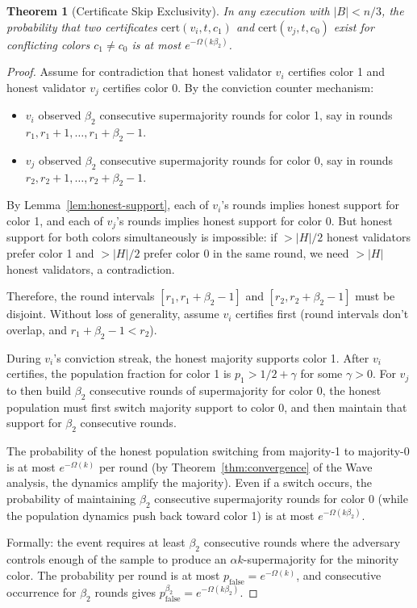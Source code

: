 \documentclass[11pt,a4paper]{article}
\newtheorem{theorem}{Theorem}[section]
\begin{document}
\begin{theorem}[Certificate Skip Exclusivity]
\label{thm:cse}
In any execution with $|B| < n/3$, the probability that two certificates
$\text{cert}(v_i, t, c_1)$ and $\text{cert}(v_j, t, c_0)$ exist for conflicting
colors $c_1 \neq c_0$ is at most $e^{-\Omega(k\beta_2)}$.
\end{theorem}

\begin{proof}
Assume for contradiction that honest validator $v_i$ certifies color 1 and honest
validator $v_j$ certifies color 0. By the conviction counter mechanism:
\begin{itemize}[nosep]
\item $v_i$ observed $\beta_2$ consecutive supermajority rounds for color 1, say in
rounds $r_1, r_1+1, \ldots, r_1+\beta_2-1$.
\item $v_j$ observed $\beta_2$ consecutive supermajority rounds for color 0, say in
rounds $r_2, r_2+1, \ldots, r_2+\beta_2-1$.
\end{itemize}

By Lemma~\ref{lem:honest-support}, each of $v_i$'s rounds implies honest support for
color 1, and each of $v_j$'s rounds implies honest support for color 0. But honest
support for both colors simultaneously is impossible: if $> |H|/2$ honest validators
prefer color 1 and $> |H|/2$ prefer color 0 in the same round, we need $> |H|$ honest
validators, a contradiction.

Therefore, the round intervals $[r_1, r_1+\beta_2-1]$ and $[r_2, r_2+\beta_2-1]$ must
be disjoint. Without loss of generality, assume $v_i$ certifies first (round intervals
don't overlap, and $r_1 + \beta_2 - 1 < r_2$).

During $v_i$'s conviction streak, the honest majority supports color 1. After $v_i$
certifies, the population fraction for color 1 is $p_1 > 1/2 + \gamma$ for some
$\gamma > 0$. For $v_j$ to then build $\beta_2$ consecutive rounds of supermajority
for color 0, the honest population must first switch majority support to color 0, and
then maintain that support for $\beta_2$ consecutive rounds.

The probability of the honest population switching from majority-1 to majority-0 is
at most $e^{-\Omega(k)}$ per round (by Theorem~\ref{thm:convergence} of the Wave
analysis, the dynamics amplify the majority). Even if a switch occurs, the probability
of maintaining $\beta_2$ consecutive supermajority rounds for color 0 (while the
population dynamics push back toward color 1) is at most $e^{-\Omega(k\beta_2)}$.

Formally: the event requires at least $\beta_2$ consecutive rounds where the adversary
controls enough of the sample to produce an $\alpha k$-supermajority for the minority
color. The probability per round is at most $p_{\text{false}} = e^{-\Omega(k)}$, and
consecutive occurrence for $\beta_2$ rounds gives $p_{\text{false}}^{\beta_2} = e^{-\Omega(k\beta_2)}$.
\end{proof}
\end{document}
